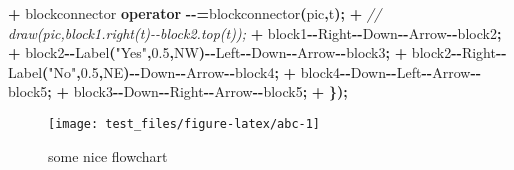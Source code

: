 \documentclass[
]{article}
\newenvironment{Shaded}{\begin{snugshade}}{\end{snugshade}}
\newcommand{\CommentTok}[1]{\textcolor[rgb]{0.56,0.35,0.01}{\textit{#1}}}
\newcommand{\FloatTok}[1]{\textcolor[rgb]{0.00,0.00,0.81}{#1}}
\newcommand{\KeywordTok}[1]{\textcolor[rgb]{0.13,0.29,0.53}{\textbf{#1}}}
\newcommand{\NormalTok}[1]{#1}
\newcommand{\OperatorTok}[1]{\textcolor[rgb]{0.81,0.36,0.00}{\textbf{#1}}}
\newcommand{\StringTok}[1]{\textcolor[rgb]{0.31,0.60,0.02}{#1}}
\begin{document}
\begin{Shaded}
\begin{Highlighting}[]
\OperatorTok{+}\NormalTok{     blockconnector }\KeywordTok{operator} \OperatorTok{{-}{-}=}\NormalTok{blockconnector}\OperatorTok{(}\NormalTok{pic}\OperatorTok{,}\NormalTok{t}\OperatorTok{);}
\OperatorTok{+}     \CommentTok{//    draw(pic,block1.right(t){-}{-}block2.top(t));}
\OperatorTok{+}\NormalTok{     block1}\OperatorTok{{-}{-}}\NormalTok{Right}\OperatorTok{{-}{-}}\NormalTok{Down}\OperatorTok{{-}{-}}\NormalTok{Arrow}\OperatorTok{{-}{-}}\NormalTok{block2}\OperatorTok{;}
\OperatorTok{+}\NormalTok{     block2}\OperatorTok{{-}{-}}\NormalTok{Label}\OperatorTok{(}\StringTok{"Yes"}\OperatorTok{,}\FloatTok{0.5}\OperatorTok{,}\NormalTok{NW}\OperatorTok{){-}{-}}\NormalTok{Left}\OperatorTok{{-}{-}}\NormalTok{Down}\OperatorTok{{-}{-}}\NormalTok{Arrow}\OperatorTok{{-}{-}}\NormalTok{block3}\OperatorTok{;}
\OperatorTok{+}\NormalTok{     block2}\OperatorTok{{-}{-}}\NormalTok{Right}\OperatorTok{{-}{-}}\NormalTok{Label}\OperatorTok{(}\StringTok{"No"}\OperatorTok{,}\FloatTok{0.5}\OperatorTok{,}\NormalTok{NE}\OperatorTok{){-}{-}}\NormalTok{Down}\OperatorTok{{-}{-}}\NormalTok{Arrow}\OperatorTok{{-}{-}}\NormalTok{block4}\OperatorTok{;}
\OperatorTok{+}\NormalTok{     block4}\OperatorTok{{-}{-}}\NormalTok{Down}\OperatorTok{{-}{-}}\NormalTok{Left}\OperatorTok{{-}{-}}\NormalTok{Arrow}\OperatorTok{{-}{-}}\NormalTok{block5}\OperatorTok{;}
\OperatorTok{+}\NormalTok{     block3}\OperatorTok{{-}{-}}\NormalTok{Down}\OperatorTok{{-}{-}}\NormalTok{Right}\OperatorTok{{-}{-}}\NormalTok{Arrow}\OperatorTok{{-}{-}}\NormalTok{block5}\OperatorTok{;}
\OperatorTok{+}   \OperatorTok{\});}
\end{Highlighting}
\end{Shaded}

\begin{figure}[h]

{\centering \texttt{[image: test\_files/figure-latex/abc-1]} 

}

\caption{some nice flowchart}\label{fig:abc}
\end{figure}
\end{document}
